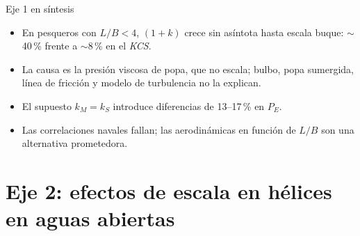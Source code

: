 \documentclass[aspectratio=169,10pt]{beamer}
\newcommand{\uk}{(1+k)}
\newcommand{\KCS}{\textit{KCS}}
\begin{document}
\begin{frame}{Eje 1 en síntesis}
\begin{itemize}
  \item En pesqueros con $L/B<4$, $\uk$ \alert{crece sin asíntota} hasta escala buque: $\sim$40\,\% frente a $\sim$8\,\% en el \KCS.
  \item La causa es la \alert{presión viscosa de popa}, que no escala; bulbo, popa sumergida, línea de fricción y modelo de turbulencia no la explican.
  \item El supuesto $k_M = k_S$ introduce diferencias de \alert{13–17\,\%} en $P_E$.
  \item Las correlaciones navales fallan; las aerodinámicas en función de $L/B$ son una alternativa prometedora.
\end{itemize}
\end{frame}

\section{Eje 2: efectos de escala en hélices en aguas abiertas}
\end{document}
